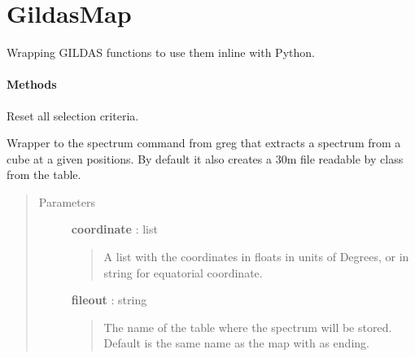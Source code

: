 \documentclass[a4paper,10pt,english]{sphinxmanual}
\begin{document}
\section{GildasMap}
\label{maps:gildasmap}

\begin{fulllineitems}
\label{maps:astrolyze.maps.gildas.GildasMap}
Wrapping GILDAS functions to use them inline with Python.
\paragraph{Methods}

\begin{fulllineitems}
\label{maps:astrolyze.maps.gildas.GildasMap.set_defaults}
Reset all selection criteria.

\end{fulllineitems}


\begin{fulllineitems}
\label{maps:astrolyze.maps.gildas.GildasMap.spectrum}
Wrapper to the spectrum command from greg that extracts
a spectrum from a cube at a given positions. By default it also creates
a 30m file readable by class from the table.
\begin{quote}\begin{description}
\item[{Parameters }] \leavevmode
\textbf{coordinate} : list
\begin{quote}

A list with the coordinates in floats in units of Degrees,
or in string for equatorial coordinate.
\end{quote}

\textbf{fileout} : string
\begin{quote}

The name of the table where the spectrum will be stored.
Default is the same name as the map with  as ending.
\end{quote}


\end{description}
\end{quote}
\end{fulllineitems}
\end{fulllineitems}
\end{document}
